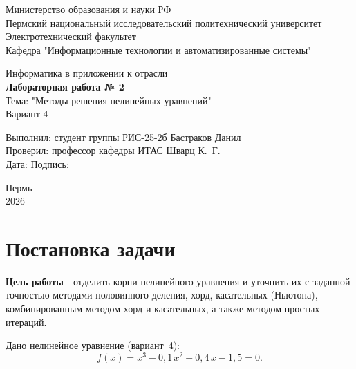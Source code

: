 \documentclass[14pt,a4paper]{extarticle}
\begin{document}
\begin{titlepage}
    \centering
    \large
    Министерство образования и науки РФ\\[0.3cm]
    Пермский национальный исследовательский политехнический университет\\[0.3cm]
    Электротехнический факультет\\[0.3cm]
    Кафедра "Информационные технологии и автоматизированные системы"

    \vspace{3.5cm}
    {\Large Информатика в приложении к отрасли}\\[0.4cm]
    {\Large\bfseries Лабораторная работа № 2}\\[0.6cm]

    Тема: "Методы решения нелинейных уравнений"\\[0.2cm]
    Вариант 4

    \vspace{4.5cm}
    \begin{flushleft}
        \large
        Выполнил: студент группы РИС-25-2б \hfill Бастраков Данил\\[0.5cm]
        Проверил: профессор кафедры ИТАС \hfill Шварц К.~Г.\\[0.5cm]
        Дата: \underline{\hspace{3cm}} \hfill Подпись: \underline{\hspace{4cm}}
    \end{flushleft}

    \vfill
    Пермь\\ 2026
\end{titlepage}

\tableofcontents
\newpage

\section{Постановка задачи}

\textbf{Цель работы} - отделить корни нелинейного уравнения и уточнить их
с заданной точностью методами половинного деления, хорд, касательных
(Ньютона), комбинированным методом хорд и касательных, а также методом
простых итераций.

Дано нелинейное уравнение (вариант~4):
\begin{equation}
    f(x) = x^3 - 0{,}1\,x^2 + 0{,}4\,x - 1{,}5 = 0.
    \label{eq:main}
\end{equation}
\end{document}
